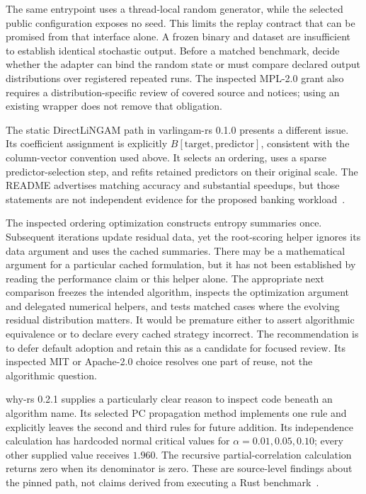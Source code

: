 The same entrypoint uses a thread-local random generator, while the selected
public configuration exposes no seed. This limits the replay contract that
can be promised from that interface alone. A frozen binary and dataset are
insufficient to establish identical stochastic output. Before a matched
benchmark, decide whether the adapter can bind the random state or must
compare declared output distributions over registered repeated runs. The
inspected MPL-2.0 grant also requires a distribution-specific review of
covered source and notices; using an existing wrapper does not remove that
obligation.

The static DirectLiNGAM path in varlingam-rs 0.1.0 presents a different issue.
Its coefficient assignment is explicitly $B[\mathrm{target},\mathrm{predictor}]$,
consistent with the column-vector convention used above. It selects an
ordering, uses a sparse predictor-selection step, and refits retained
predictors on their original scale. The README advertises matching accuracy
and substantial speedups, but those statements are not independent evidence
for the proposed banking workload~\citep{exec13_other_varlingam}.

The inspected ordering optimization constructs entropy summaries once.
Subsequent iterations update residual data, yet the root-scoring helper
ignores its data argument and uses the cached summaries. There may be a
mathematical argument for a particular cached formulation, but it has not
been established by reading the performance claim or this helper alone.
The appropriate next comparison freezes the intended algorithm, inspects
the optimization argument and delegated numerical helpers, and tests
matched cases where the evolving residual distribution matters. It would be
premature either to assert algorithmic equivalence or to declare every
cached strategy incorrect. The recommendation is to defer default adoption
and retain this as a candidate for focused review. Its inspected MIT or
Apache-2.0 choice resolves one part of reuse, not the algorithmic question.

why-rs 0.2.1 supplies a particularly clear reason to inspect code beneath an
algorithm name. Its selected PC propagation method implements one rule and
explicitly leaves the second and third rules for future addition. Its
independence calculation has hardcoded normal critical values for
$\alpha=0.01,0.05,0.10$; every other supplied value receives $1.960$.
The recursive partial-correlation calculation returns zero when its
denominator is zero. These are source-level findings about the pinned path,
not claims derived from executing a Rust benchmark~\citep{exec13_other_why}.

